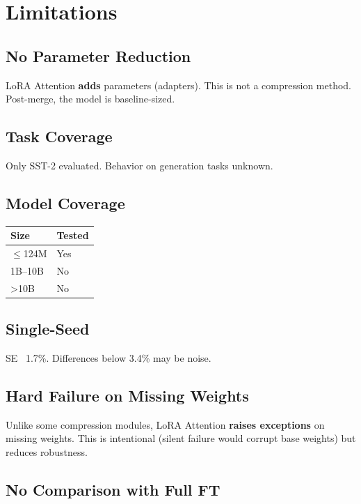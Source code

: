 \section{Limitations}

\subsection{No Parameter Reduction}

LoRA Attention \textbf{adds} parameters (adapters). This is not a compression 
method. Post-merge, the model is baseline-sized.

\subsection{Task Coverage}

Only SST-2 evaluated. Behavior on generation tasks unknown.

\subsection{Model Coverage}

\begin{table}[H]
\centering
\small
\begin{tabular}{ll}
\toprule
\textbf{Size} & \textbf{Tested} \\
\midrule
$\le$124M & Yes \\
1B--10B & No \\
>10B & No \\
\bottomrule
\end{tabular}
\end{table}

\subsection{Single-Seed}

SE ~1.7\%. Differences below 3.4\% may be noise.

\subsection{Hard Failure on Missing Weights}

Unlike some compression modules, LoRA Attention \textbf{raises exceptions} on 
missing weights. This is intentional (silent failure would corrupt base 
weights) but reduces robustness.

\subsection{No Comparison with Full FT}

